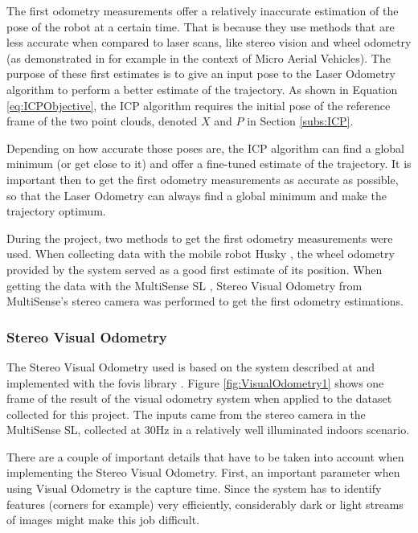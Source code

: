 \documentclass[12pt]{article}
\begin{document}
The first odometry measurements offer a relatively inaccurate estimation of the pose of the robot at a certain time. That is because they use methods that are less accurate when compared to laser scans, like stereo vision and wheel odometry (as demonstrated in \cite{achtelik2009stereo} for example in the context of Micro Aerial Vehicles). The purpose of these first estimates is to give an input pose to the Laser Odometry algorithm to perform a better estimate of the trajectory. As shown in Equation \ref{eq:ICPObjective}, the ICP algorithm requires the initial pose of the reference frame of the two point clouds, denoted $X$ and $P$ in Section \ref{subs:ICP}.

Depending on how accurate those poses are, the ICP algorithm can find a global minimum (or get close to it) and offer a fine-tuned estimate of the trajectory. It is important then to get the first odometry measurements as accurate as possible, so that the Laser Odometry can always find a global minimum and make the trajectory optimum.
	
During the project, two methods to get the first odometry measurements were used. When collecting data with the mobile robot Husky \cite{Husky}, the wheel odometry provided by the system served as a good first estimate of its position. When getting the data with the MultiSense SL \cite{multisense}, Stereo Visual Odometry from MultiSense's stereo camera was performed to get the first odometry estimations.
	
	\subsubsection*{Stereo Visual Odometry}

The Stereo Visual Odometry used is based on the system described at \cite{VisualOdometry} and implemented with the fovis library \cite{fovis}. Figure \ref{fig:VisualOdometry1} shows one frame of the result of the visual odometry system when applied to the dataset collected for this project. The inputs came from the stereo camera in the MultiSense SL, collected at 30Hz in a relatively well illuminated indoors scenario.
	
There are a couple of important details that have to be taken into account when implementing the Stereo Visual Odometry. First, an important parameter when using Visual Odometry is the capture time. Since the system has to identify features (corners for example) very efficiently, considerably dark or light streams of images might make this job difficult.  
	
\end{document}
